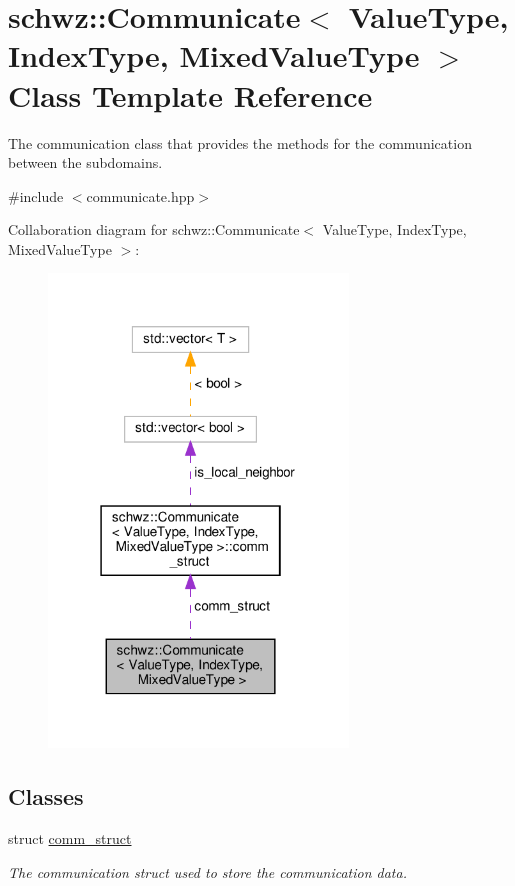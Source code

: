 \hypertarget{classschwz_1_1Communicate}{}\section{schwz\+:\+:Communicate$<$ Value\+Type, Index\+Type, Mixed\+Value\+Type $>$ Class Template Reference}
\label{classschwz_1_1Communicate}


The communication class that provides the methods for the communication between the subdomains.  




{\ttfamily \#include $<$communicate.\+hpp$>$}



Collaboration diagram for schwz\+:\+:Communicate$<$ Value\+Type, Index\+Type, Mixed\+Value\+Type $>$\+:
\nopagebreak
\begin{figure}[H]
\begin{center}
\leavevmode
\includegraphics[width=226pt]{classschwz_1_1Communicate__coll__graph}
\end{center}
\end{figure}
\subsection*{Classes}
\begin{DoxyCompactItemize}
\item 
struct \hyperlink{structschwz_1_1Communicate_1_1comm__struct}{comm\+\_\+struct}
\begin{DoxyCompactList}\small\item\em The communication struct used to store the communication data. \end{DoxyCompactList}\end{DoxyCompactItemize}
